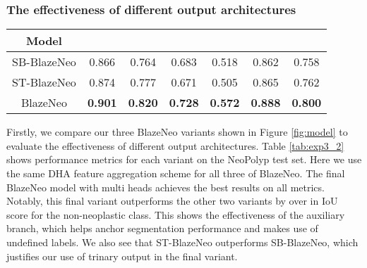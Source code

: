 \documentclass{ieeeaccess}
\newcommand{\ModelName}{BlazeNeo\xspace}
\newcommand{\DatasetName}{NeoPolyp\xspace}
\begin{document}
\subsubsection{The effectiveness of different output architectures}
\begin{table*}[ht!]
    \centering
    \caption{Performance metrics on the \DatasetName test set for the three variants of BlazeNeo using the same DHA feature aggregation scheme}
    \label{tab:exp3_2}
    \begin{tabular}{@{} c| c c c c c c @{}}
        \toprule
        
        \multicolumn{1}{c|}{Model} & \multicolumn{1}{c}{} & \multicolumn{1}{c}{} & \multicolumn{1}{c}{} & \multicolumn{1}{c}{} & \multicolumn{1}{c}{} & \multicolumn{1}{c}{} \\ \midrule \midrule
        SB-\ModelName              & 0.866                                   & 0.764                                  & 0.683                                   & 0.518                                  & 0.862                                   & 0.758                                  \\
        ST-\ModelName              & 0.874                                   & 0.777                                  & 0.671                                   & 0.505                                  & 0.865                                   & 0.762                                  \\
        \ModelName                 & \textbf{0.901}                          & \textbf{0.820}                         & \textbf{0.728}                          & \textbf{0.572}                         & \textbf{0.888}                          & \textbf{0.800}                         \\
        \bottomrule
    \end{tabular}
\end{table*}

Firstly, we compare our three \ModelName variants shown in Figure \ref{fig:model} to evaluate the effectiveness of different output architectures. Table \ref{tab:exp3_2} shows performance metrics for each variant on the \DatasetName test set. Here we use the same DHA feature aggregation scheme for all three of \ModelName. The final \ModelName model with multi heads achieves the best results on all metrics. Notably, this final variant outperforms the other two variants by over  in IoU score for the non-neoplastic class. This shows the effectiveness of the auxiliary branch, which helps anchor segmentation performance and makes use of undefined labels. We also see that ST-\ModelName outperforms SB-\ModelName, which justifies our use of trinary output in the final variant.
\end{document}
